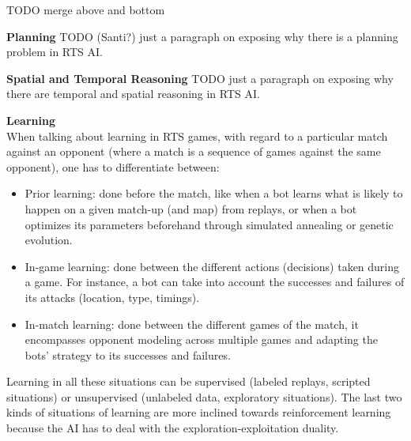 \documentclass[journal]{IEEEtran}
\begin{document}
{\color{red}
TODO merge above and bottom
}

{\color{blue}
\textbf{Planning}
TODO (Santi?) just a paragraph on exposing why there is a planning problem in RTS AI.

\textbf{Spatial and Temporal Reasoning}
TODO just a paragraph on exposing why there are temporal and spatial reasoning in RTS AI.
}

\textbf{Learning}\\
When talking about learning in RTS games, with regard to a particular match against an opponent (where a match is a sequence of games against the same opponent), one has to differentiate between:
\begin{itemize}
\item Prior learning: done before the match, like when a bot learns what is likely to happen on a given match-up (and map) from replays, or when a bot optimizes its parameters beforehand through simulated annealing or genetic evolution.
\item In-game learning: done between the different actions (decisions) taken during a game. For instance, a bot can take into account the successes and failures of its attacks (location, type, timings).
\item In-match learning: done between the different games of the match, it encompasses opponent modeling across multiple games and adapting the bots' strategy to its successes and failures.
\end{itemize}
Learning in all these situations can be supervised (labeled replays, scripted situations) or unsupervised (unlabeled data, exploratory situations). The last two kinds of situations of learning are more inclined towards reinforcement learning because the AI has to deal with the exploration-exploitation duality. %

\end{document}
